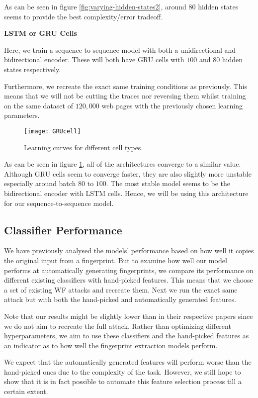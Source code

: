 \noindent
As can be seen in figure \ref{fig:varying-hidden-states2}, around $80$ hidden states seems to provide the best complexity/error tradeoff.

\noindent
\textbf{LSTM or GRU Cells}

Here, we train a sequence-to-sequence model with both a unidirectional and bidirectional encoder.
These will both have GRU cells with $100$ and $80$ hidden states respectively.

Furthermore, we recreate the exact same training conditions as previously.
This means that we will not be cutting the traces nor reversing them whilst training on the same dataset of $120,000$ web pages with the previously chosen learning parameters.

\begin{figure}[ht]
  \centering
  \texttt{[image: GRUcell]}
  \caption{Learning curves for different cell types.}
  \label{fig:varying-cell-type}
\end{figure}

As can be seen in figure \ref{fig:varying-cell-type}, all of the architectures converge to a similar value.
Although GRU cells seem to converge faster, they are also slightly more unstable especially around batch $80$ to $100$.
The most stable model seems to be the bidirectional encoder with LSTM cells.
Hence, we will be using this architecture for our sequence-to-sequence model.

\subsection{Classifier Performance}

We have previously analysed the models' performance based on how well it copies the original input from a fingerprint.
But to examine how well our model performs at automatically generating fingerprints, we compare its performance on different existing classifiers with hand-picked features.
This means that we choose a set of existing WF attacks and recreate them.
Next we run the exact same attack but with both the hand-picked and automatically generated features.

Note that our results might be slightly lower than in their respective papers since we do not aim to recreate the full attack.
Rather than optimizing different hyperparameters, we aim to use these classifiers and the hand-picked features as an indicator as to how well the fingerprint extraction models perform.

We expect that the automatically generated features will perform worse than the hand-picked ones due to the complexity of the task.
However, we still hope to show that it is in fact possible to automate this feature selection process till a certain extent.


